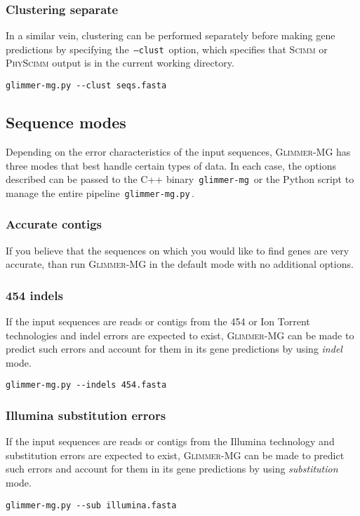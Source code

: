 \documentclass[fleqn,titlepage,11pt]{article}
\def\Gmg{\textsc{Glimmer-MG}}
\def\Scimm{\textsc{Scimm}}
\def\PhyScimm{\textsc{PhyScimm}}
\def\Pg#1{\texttt{#1}}
\begin{document}
\subsubsection{Clustering separate}
In a similar vein, clustering can be performed separately before
making gene predictions by specifying the \,\Pg{--clust}\, option,
which specifies that \Scimm{} or \PhyScimm{} output is in the current
working directory.
\BSV
\begin{verbatim}
glimmer-mg.py --clust seqs.fasta
\end{verbatim}
\ESV

\subsection{Sequence modes}
Depending on the error characteristics of the input sequences, \Gmg{}
has three modes that best handle certain types of data. In each case,
the options described can be passed to the C++ binary
\,\Pg{glimmer-mg}\, or the Python script to manage the entire pipeline
\,\Pg{glimmer-mg.py}\,.

\subsubsection{Accurate contigs}
If you believe that the sequences on which you would like to find
genes are very accurate, than run \Gmg{} in the default mode with no
additional options.

\subsubsection{454 indels}
If the input sequences are reads or contigs from the 454 or Ion
Torrent technologies and indel errors are expected to exist, \Gmg{}
can be made to predict such errors and account for them in its gene
predictions by using \emph{indel} mode.
\BSV
\begin{verbatim}
glimmer-mg.py --indels 454.fasta
\end{verbatim}
\ESV

\subsubsection{Illumina substitution errors}
If the input sequences are reads or contigs from the Illumina
technology and substitution errors are expected to exist, \Gmg{}
can be made to predict such errors and account for them in its gene
predictions by using \emph{substitution} mode.
\BSV
\begin{verbatim}
glimmer-mg.py --sub illumina.fasta
\end{verbatim}
\ESV
\end{document}
